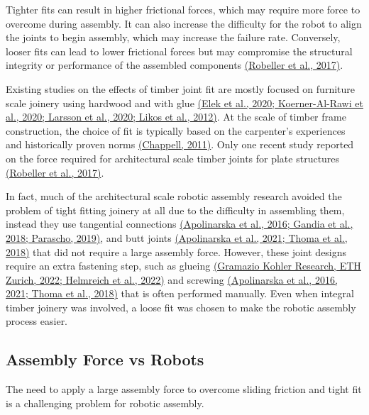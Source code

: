 \documentclass[11pt]{book}
\begin{document}
Tighter fits can result in higher frictional forces, which may require more force to overcome during assembly. It can also increase the difficulty for the robot to align the joints to begin assembly, which may increase the failure rate. Conversely, looser fits can lead to lower frictional forces but may compromise the structural integrity or performance of the assembled components \href{https://www.zotero.org/google-docs/?uzXtzz}{(Robeller et al., 2017)}.

Existing studies on the effects of timber joint fit are mostly focused on furniture scale joinery using hardwood and with glue \href{https://www.zotero.org/google-docs/?G6Rwhz}{(Elek et al., 2020; Koerner-Al-Rawi et al., 2020; Larsson et al., 2020; Likos et al., 2012)}. At the scale of timber frame construction, the choice of fit is typically based on the carpenter's experiences and historically proven norms \href{https://www.zotero.org/google-docs/?Gwwdvh}{(Chappell, 2011)}. Only one recent study reported on the force required for architectural scale timber joints for plate structures \href{https://www.zotero.org/google-docs/?saXZ5b}{(Robeller et al., 2017)}. 

In fact, much of the architectural scale robotic assembly research avoided the problem of tight fitting joinery at all due to the difficulty in assembling them, instead they use tangential connections \href{https://www.zotero.org/google-docs/?I1l6rV}{(Apolinarska et al., 2016; Gandia et al., 2018; Parascho, 2019)}, and butt joints \href{https://www.zotero.org/google-docs/?1HKFGK}{(Apolinarska et al., 2021; Thoma et al., 2018)} that did not require a large assembly force. However, these joint designs require an extra fastening step, such as glueing \href{https://www.zotero.org/google-docs/?uhxjvO}{(Gramazio Kohler Research, ETH Zurich, 2022; Helmreich et al., 2022)} and screwing \href{https://www.zotero.org/google-docs/?uAzdbA}{(Apolinarska et al., 2016, 2021; Thoma et al., 2018)} that is often performed manually. Even when integral timber joinery was involved, a loose fit was chosen to make the robotic assembly process easier. 

\subsection{Assembly Force vs Robots}

The need to apply a large assembly force to overcome sliding friction and tight fit is a challenging problem for robotic assembly. 
\end{document}
